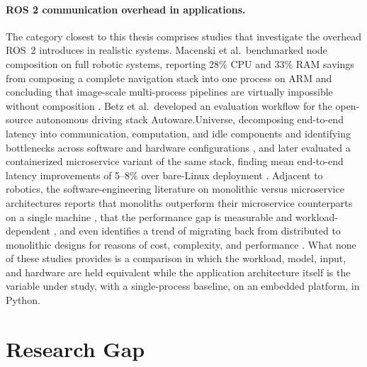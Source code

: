 \paragraph{ROS 2 communication overhead in applications.}
The category closest to this thesis comprises studies that investigate
the overhead ROS~2 introduces in realistic systems. Macenski et al.\
benchmarked node composition on full robotic systems, reporting 28\% CPU
and 33\% RAM savings from composing a complete navigation stack into one
process on ARM and concluding that image-scale multi-process pipelines
are virtually impossible without composition \cite{macenski2023}. Betz
et al.\ developed an evaluation workflow for the open-source autonomous
driving stack Autoware.Universe, decomposing end-to-end latency into
communication, computation, and idle components and identifying
bottlenecks across software and hardware configurations
\cite{betz2023a}, and later evaluated a containerized microservice
variant of the same stack, finding mean end-to-end latency improvements
of 5--8\% over bare-Linux deployment \cite{betz2024}. Adjacent to
robotics, the software-engineering literature on monolithic versus
microservice architectures reports that monoliths outperform their
microservice counterparts on a single machine \cite{blinowski2022}, that
the performance gap is measurable and workload-dependent
\cite{tapia2020}, and even identifies a trend of migrating back from
distributed to monolithic designs for reasons of cost, complexity, and
performance \cite{felisberto2024}. What none of these studies provides is
a comparison in which the workload, model, input, and hardware are held
equivalent while the application architecture itself is the variable
under study, with a single-process baseline, on an embedded platform, in
Python.

\section{Research Gap}
\label{sec:gap}

